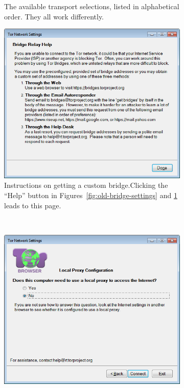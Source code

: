 \documentclass[USenglish,oneside,twocolumn]{article}
\begin{document}
\begin{figure}
\begin{subfigure}[b]{0.35\textwidth}
	\caption{The available transport selections, listed in alphabetical order. They all work differently.}
	\label{fig:old-bridge-combobox}
\end{subfigure}
\begin{subfigure}[b]{0.35\textwidth}
	\includegraphics[width=\textwidth]{screenshots/OLD-bridgeHelp.png}
	\caption{Instructions on getting a custom bridge.Clicking the ``Help'' button in Figures~\ref{fig:old-bridge-settings} and \ref {fig:old-bridge-combobox} leads to this page.}
	\label{fig:old-bridge-help}
\end{subfigure}
~~~~~~~~~~
\begin{subfigure}[b]{0.35\textwidth}
	\includegraphics[width=\textwidth]{screenshots/OLD-proxy.png}

\end{subfigure}
\end{figure}
\end{document}
